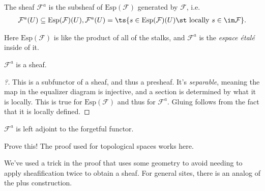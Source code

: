 \begin{definition}

The sheaf \(\mathcal{F}^a\) is the subsheaf of
\(\mathrm{Esp}(\mathcal{F})\) generated by \(\mathcal{F}\), i.e.
\begin{align*}  
\mathcal{F}^a(U) \subseteq \mathrm{Esp}(\mathcal{F})(U), \mathcal{F}^a(U) = \ts{s\in \mathrm{Esp}(\mathcal{F})(U)  \st \text{ locally } s\in \im \mathcal{F}}
.\end{align*}

\end{definition}

\begin{remark}

Here \(\mathrm{Esp}(\mathcal{F})\) is like the product of all of the
stalks, and \(\mathcal{F}^a\) is the \emph{espace étalé} inside of it.

\end{remark}

\begin{proposition}[?]

\(\mathcal{F}^a\) is a sheaf.

\end{proposition}

\begin{proof}[?]

This is a subfunctor of a sheaf, and thus a presheaf. It's
\emph{separable}, meaning the map in the equalizer diagram is injective,
and a section is determined by what it is locally. This is true for
\(\mathrm{Esp}(\mathcal{F})\) and thus for \(\mathcal{F}^a\). Gluing
follows from the fact that it is locally defined.

\end{proof}

\begin{proposition}[?]

\(\mathcal{F}^a\) is left adjoint to the forgetful functor.

\end{proposition}

\begin{exercise}[Important!]

Prove this! The proof used for topological spaces works here.

\end{exercise}

\begin{remark}

We've used a trick in the proof that uses some geometry to avoid needing
to apply sheafification twice to obtain a sheaf. For general sites,
there is an analog of the plus construction.

\end{remark}

